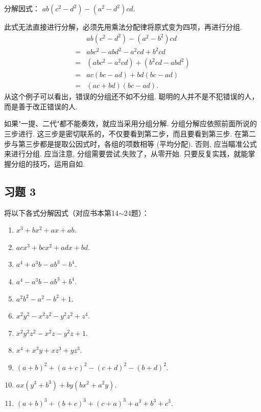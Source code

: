 \begin{example}[从零开始]
	分解因式： $a b\left(c^{2}-d^{2}\right)-\left(a^{2}-d^{2}\right) c d.$
\end{example}
\begin{solution}
	此式无法直接进行分解，必须先用乘法分配律将原式变为四项，再进行分组.
	\begin{align*}
		  & a b\left(c^{2}-d^{2}\right)-\left(a^{2}-b^{2}\right) c d          \\
		= & a b c^{2}-a b d^{2}-a^{2} c d+b^{2} c d                           \\
		= & \left(a b c^{2}-a^{2} c d\right)+\left(b^{2} c d-a b d^{2}\right) \\
		= & a c(b c-a d)+b d(b c-a d)                                         \\
		= & (a c+b d)(b c-a d) .
	\end{align*}
	从这个例子可以看出，错误的分组还不如不分组. 聪明的人并不是不犯错误的人，而是善于改正错误的人.
\end{solution}
如果"一提、二代"都不能奏效，就应当采用分组分解. 分组分解应依照前面所说的三步进行. 这三步是密切联系的，不仅要看到第二步，而且要看到第三步. 在第二步与第三步都是提取公因式时，各组的项数相等 (平均分配). 否则, 应当瞄准公式来进行分组. 应当注意, 分组需要尝试,失败了，从零开始. 只要反复实践，就能掌握分组的技巧，运用自如.

\subsection*{习题 3}
将以下各式分解因式（对应书本第14$\sim$24题）：
\begin{enumerate}
	\item $ x^{3}+b x^{2}+a x+a b$.
	\item $ a c x^{3}+b c x^{2}+a d x+b d$.
	\item $ a^{4}+a^{3} b-a b^{3}-b^{4}$.
	\item $ a^{4}-a^{3} b-a b^{3}+b^{4}$.
	\item $ a^{2} b^{2}-a^{2}-b^{2}+1$.
	\item $ x^{2} y^{2}-x^{2} z^{2}-y^{2} z^{2}+z^{4}$.
	\item $ x^{2} y^{2} z^{2}-x^{2} z-y^{2} z+1$.
	\item $ x^{4}+x^{3} y+x z^{3}+y z^{3}$.
	\item $(a+b)^{2}+(a+c)^{2}-(c+d)^{2}-(b+d)^{2}$.
	\item $ a x\left(y^{3}+b^{3}\right)+b y\left(b x^{2}+a^{2} y\right)$.
	\item $(a+b)^{3}+(b+c)^{3}+(c+a)^{3}+a^{3}+b^{3}+c^{3}$.
\end{enumerate}

